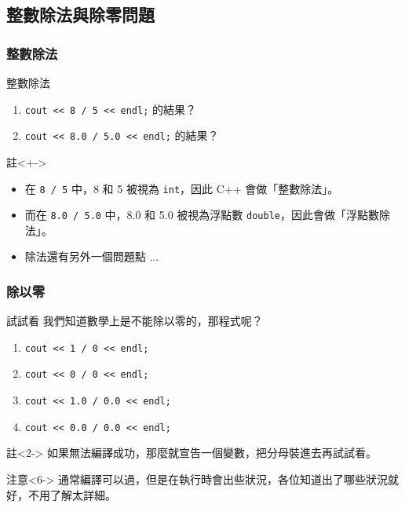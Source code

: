 \documentclass[utf8]{beamer}
\begin{document}
\begin{CJK}{UTF8}{bkai}
\subsection{整數除法與除零問題}

\begin{frame}[fragile]
  \frametitle{整數除法}
  \begin{block}{整數除法}
    \begin{enumerate}[<+->]
    \item \lstinline{cout << 8 / 5 << endl;} 的結果？
    \item \lstinline{cout << 8.0 / 5.0 << endl;} 的結果？
    \end{enumerate}
  \end{block}
  \begin{exampleblock}{註}<+->
    \begin{itemize}
    \item 在 \lstinline{8 / 5} 中，8 和 5 被視為 \lstinline{int}，因此 C++ 會做「\alert{整數除法}」。
    \item<+-> 而在 \lstinline{8.0 / 5.0} 中，8.0 和 5.0 被視為浮點數 \lstinline{double}，因此會做「\alert{浮點數除法}」。
    \end{itemize}
  \end{exampleblock}
  \begin{itemize}[<+->]
  \item 除法還有另外一個問題點 ...
  \end{itemize}
\end{frame}

\begin{frame}[fragile]
  \frametitle{除以零}
  \begin{block}{試試看}
    我們知道數學上是不能除以零的，那程式呢？
    \begin{enumerate}
    \item \lstinline{cout << 1 / 0 << endl;}
    \item<3-> \lstinline{cout << 0 / 0 << endl;}
    \item<4-> \lstinline{cout << 1.0 / 0.0 << endl;}
    \item<5-> \lstinline{cout << 0.0 / 0.0 << endl;}
    \end{enumerate}
  \end{block}
  \begin{exampleblock}{註}<2->
  如果無法編譯成功，那麼就宣告一個變數，把分母裝進去再試試看。
  \end{exampleblock}
  \begin{alertblock}{注意}<6->
  通常編譯可以過，但是在執行時會出些狀況，各位知道出了哪些狀況就好，不用了解太詳細。
  \end{alertblock}
\end{frame}


\end{CJK}
\end{document}
